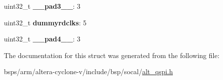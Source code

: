 \begin{DoxyCompactItemize}
\mbox{\label{structALT__QSPI__DEVRD__s_a5cb6026cd28dd9531f031669a9a848ae}} 
uint32\+\_\+t {\bfseries \+\_\+\+\_\+pad3\+\_\+\+\_\+}\+: 3
\item 
\mbox{\label{structALT__QSPI__DEVRD__s_a9676c6c882565fc0edfff2fcce14ba6e}} 
uint32\+\_\+t {\bfseries dummyrdclks}\+: 5
\item 
\mbox{\label{structALT__QSPI__DEVRD__s_a2c0fa40a666f5627bcfd0fb42e8d2995}} 
uint32\+\_\+t {\bfseries \+\_\+\+\_\+pad4\+\_\+\+\_\+}\+: 3
\end{DoxyCompactItemize}


The documentation for this struct was generated from the following file\+:\begin{DoxyCompactItemize}
\item 
bsps/arm/altera-\/cyclone-\/v/include/bsp/socal/\mbox{\hyperlink{include_2bsp_2socal_2alt__qspi_8h}{alt\+\_\+qspi.\+h}}\end{DoxyCompactItemize}
